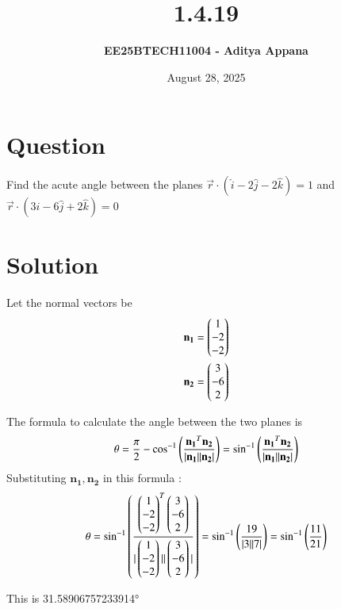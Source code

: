 \documentclass[12pt]{article}
\title{\textbf{1.4.19}}
\author{\textbf{EE25BTECH11004 - Aditya Appana}}
\date{August 28, 2025}
\begin{document}
\maketitle

\section*{Question}
Find the acute angle between the planes $ \vec{r} \cdot (\hat{i} - 2\hat{j} - 2\hat{k}) = 1$ and  $ \vec{r} \cdot (3\hat{i} - 6\hat{j} + 2\hat{k}) = 0$

\section*{Solution}
Let the normal vectors be 
\begin{align} 
\vec{n_1}=\myvec{1\\-2\\-2} \\
\vec{n_2}=\myvec{3\\-6\\2}
\end{align}

\vspace{1cm}

The formula to calculate the angle between the two planes is
\begin{align}
\theta = \frac{\pi}{2} - \cos^{-1}\brak{\frac{\vec{n_1}^T\vec{n_2}}{|\vec{n_1}||\vec{n_2}|}}
= \sin^{-1}\brak{\frac{\vec{n_1}^T\vec{n_2}}{|\vec{n_1}||\vec{n_2}|}}
\end{align}
\newpage
Substituting $\mathbf{n_1, n_2}$ in this formula :
\begin{align}
\theta = \sin^{-1}\brak{\frac{\myvec{1\\-2\\-2}^T\myvec{3\\-6\\2}} {|\myvec{1\\-2\\-2}||\myvec{3\\-6\\2}|}}
= \sin^{-1}\brak{\frac{19}{|3||7|}}
= \sin^{-1}\brak{\frac{11}{21}} 
\end{align}
\vspace{0.5cm}

\centering
This is 31.58906757233914°
\end{document}
